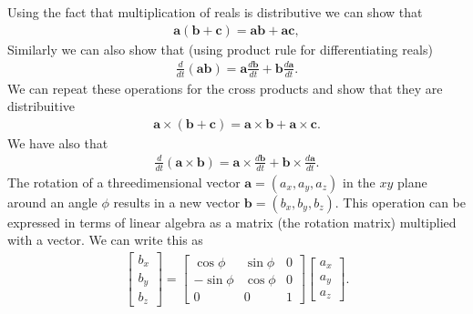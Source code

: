 \documentclass[letterpaper,10pt,english]{sphinxmanual}
\begin{document}
Using the fact that multiplication of reals is distributive we can show that
\begin{equation*}
\begin{split}
\boldsymbol{a}(\boldsymbol{b}+\boldsymbol{c})=\boldsymbol{a}\boldsymbol{b}+\boldsymbol{a}\boldsymbol{c},
\end{split}
\end{equation*}
Similarly we can also show that (using product rule for differentiating reals)
\begin{equation*}
\begin{split}
\frac{d}{dt}(\boldsymbol{a}\boldsymbol{b})=\boldsymbol{a}\frac{d\boldsymbol{b}}{dt}+\boldsymbol{b}\frac{d\boldsymbol{a}}{dt}.
\end{split}
\end{equation*}
We can repeat these operations for the cross products and show that they are distribuitive
\begin{equation*}
\begin{split}
\boldsymbol{a}\times(\boldsymbol{b}+\boldsymbol{c})=\boldsymbol{a}\times\boldsymbol{b}+\boldsymbol{a}\times\boldsymbol{c}.
\end{split}
\end{equation*}
We have also that
\begin{equation*}
\begin{split}
\frac{d}{dt}(\boldsymbol{a}\times\boldsymbol{b})=\boldsymbol{a}\times\frac{d\boldsymbol{b}}{dt}+\boldsymbol{b}\times\frac{d\boldsymbol{a}}{dt}.
\end{split}
\end{equation*}
The rotation of a three\sphinxhyphen{}dimensional  vector \(\boldsymbol{a}=(a_x,a_y,a_z)\) in the \(xy\) plane around an angle \(\phi\) results in a new vector \(\boldsymbol{b}=(b_x,b_y,b_z)\).  This operation can be expressed in terms of linear algebra as a matrix (the rotation matrix) multiplied with a vector. We can write this as
\begin{equation*}
\begin{split}
\begin{bmatrix} b_x \\ b_y \\ b_z \end{bmatrix} = \begin{bmatrix} \cos{\phi} & \sin{\phi} & 0 \\ -\sin{\phi} & \cos{\phi} & 0 \\ 0 & 0 & 1\end{bmatrix}\begin{bmatrix} a_x \\ a_y \\ a_z \end{bmatrix}.
\end{split}
\end{equation*}
\end{document}
